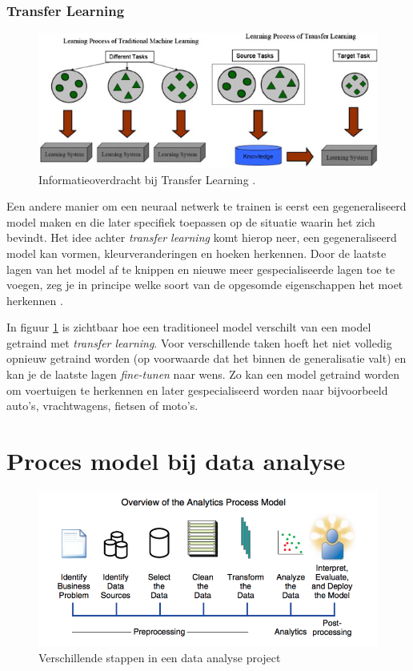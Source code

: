 \subsubsection{Transfer Learning}
\label{subsubsec:transfer-learning}

\begin{figure}
    \includegraphics[width=\linewidth]{img/transfer-learning.jpg}
    \caption{Informatieoverdracht bij Transfer Learning \autocite{Pan2009}.}
    \label{fig:transfer-learning}
\end{figure}

Een andere manier om een neuraal netwerk te trainen is eerst een gegeneraliseerd model maken en die later specifiek toepassen op de situatie waarin het zich bevindt. Het idee achter \textit{transfer learning} komt hierop neer, een gegeneraliseerd model kan vormen, kleurveranderingen en hoeken herkennen. Door de laatste lagen van het model af te knippen en nieuwe meer gespecialiseerde lagen toe te voegen, zeg je in principe welke soort van de opgesomde eigenschappen het moet herkennen \autocite{Khandelwal2019}. 

In figuur \ref{fig:transfer-learning} is zichtbaar hoe een traditioneel model verschilt van een model getraind met \textit{transfer learning}. Voor verschillende taken hoeft het niet volledig opnieuw getraind worden (op voorwaarde dat het binnen de generalisatie valt) en kan je de laatste lagen \textit{fine-tunen} naar wens. Zo kan een model getraind worden om voertuigen te herkennen en later gespecialiseerd worden naar bijvoorbeeld auto's, vrachtwagens, fietsen of moto's.

\section{Proces model bij data analyse}
\label{sec:proces-model}

\begin{figure}
    \includegraphics[width=\linewidth]{img/proces-model.png}
    \caption{Verschillende stappen in een data analyse project \autocite{Lemahieu2018}}
    \label{fig:proces-model.png}
\end{figure}

